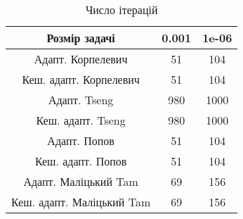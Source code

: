 \begin{table}[H]
	\centering
	\begin{tabular}{|c||c|c|}\hline
		Розмір задачі & 0.001 & 1e-06 \\ \hline \hline
		Адапт. Корпелевич & 51 & 104 \\ \hline
		Кеш. адапт. Корпелевич & 51 & 104 \\ \hline
		Адапт. Tseng & 980 & 1000 \\ \hline
		Кеш. адапт. Tseng & 980 & 1000 \\ \hline
		Адапт. Попов & 51 & 104 \\ \hline
		Кеш. адапт. Попов & 51 & 104 \\ \hline
		Адапт. Маліцький Tam & 69 & 156 \\ \hline
		Кеш. адапт. Маліцький Tam & 69 & 156 \\ \hline
	\end{tabular}
	\caption{Число ітерацій}
\end{table}
